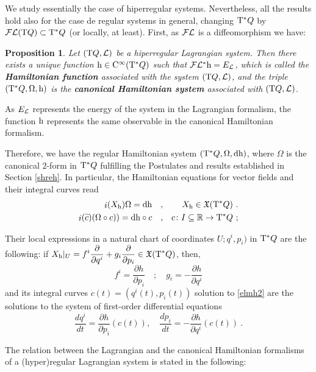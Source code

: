 \documentclass[12pt]{report}
\newtheorem{prop}[teor]{Proposition}
\def\beq{\begin{equation}}
\def\eeq{\end{equation}}
\def\bea{\begin{eqnarray}}
\def\eea{\end{eqnarray}}
\def\derpar#1#2{\frac{\partial{#1}}{\partial{#2}}}
\def\vf{\mathfrak X}
\def\Lag{{\cal L}}
\def\d{{\rm d}}
\def\Real{\mathbb{R}}
\def\Tan{{\rm T}}
\def\inn{\mathop{i}\nolimits}
\def\Cinfty{{\rm C}^\infty}
\def\Leg{{\cal F}\Lag}
\begin{document}
We study essentially the case of hiperregular systems.
Nevertheless, all the results hold also for the case de
regular systems in general,
changing $\Tan^*Q$ by $\Leg (\Tan Q)\subset\Tan^*Q$
(or locally, at least).
First, as $\Leg$ is a diffeomorphism we have:

\begin{prop}
Let $(\Tan Q,\Lag)$ be a hiperregular Lagrangian system.
Then there exists a unique function ${\rm h}\in\Cinfty (\Tan^*Q)$ such that
$\Leg^*{\rm h}=E_\Lag$,
which is called the \textbf{Hamiltonian function} associated with the system
$(\Tan Q,\Lag)$,
and the triple $(\Tan^*Q,\Omega,{\rm h})$ is the 
\textbf{canonical Hamiltonian system} associated with $(\Tan Q,\Lag)$.
\end{prop}

As $E_\Lag$ represents the energy
of the system in the Lagrangian formalism, the function ${\rm h}$
represents the same observable in the canonical Hamiltonian formalism.

Therefore, we have the regular Hamiltonian system
$(\Tan^*Q,\Omega,\d {\rm h})$, where $\Omega$ is the canonical $2$-form in
$\Tan^*Q$
fulfilling the Postulates and results established in Section \ref{shreh}.
In particular, the Hamiltonian equations for vector fields and their
integral curves read
\bea
\inn(X_{\rm h})\Omega=\d {\rm h} \quad &,& \quad X_{\rm h}\in\vf(\Tan^* Q) \ .
\label{elmh} \\
\inn(\widetilde c)(\Omega\circ c))=\d {\rm h}\circ c \quad &,& c\colon I\subseteq\Real\to\Tan^* Q \ ;
\label{elmh2}
\eea

Their local expressions in a natural chart of coordinates
$U;q^i,p_i)$ in $\Tan^*Q$ are the following:
if $\displaystyle X_{\rm h}\vert_U=f^i\derpar{}{q^i}+g_i\derpar{}{p_i}\in\vf (\Tan^*Q)$,
then,
$$
f^i= \derpar{h}{p_i} \quad ; \quad g_i=-\derpar{h}{q^i}
$$
and its integral curves $c(t)=(q^i(t),p_i(t))$ solution to  \eqref{elmh2} are
the solutions to the system of first-order differential equations
\beq
\frac{d q^i}{d t} = \derpar{h}{p_i}(c(t))
,\quad
\frac{d p_i}{d t} = -\derpar{h}{q^i}(c(t)) \ .
\label{hameq3}
\eeq

The relation between the Lagrangian and the canonical Hamiltonian formalisms of a (hyper)regular Lagrangian system is stated in the following:
\end{document}

